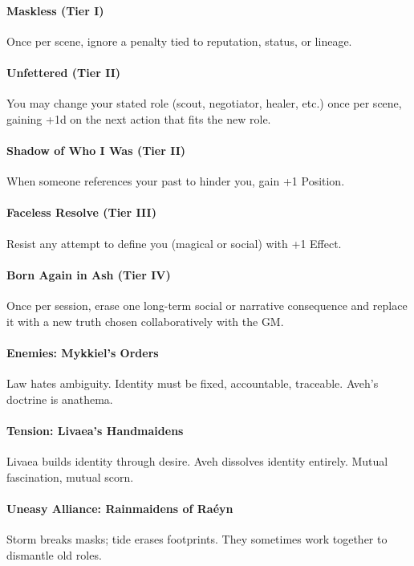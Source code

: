 \documentclass[11pt]{book}
\begin{document}
\paragraph{Maskless (Tier I)}
Once per scene, ignore a penalty tied to reputation, status, or lineage.

\paragraph{Unfettered (Tier II)}
You may change your stated role (scout, negotiator, healer, etc.) once per scene,  
gaining +1d on the next action that fits the new role.

\paragraph{Shadow of Who I Was (Tier II)}
When someone references your past to hinder you, gain +1 Position.

\paragraph{Faceless Resolve (Tier III)}
Resist any attempt to define you (magical or social) with +1 Effect.

\paragraph{Born Again in Ash (Tier IV)}
Once per session, erase one long-term social or narrative consequence  
and replace it with a new truth chosen collaboratively with the GM.

\paragraph{Enemies: Mykkiel's Orders}
Law hates ambiguity.  
Identity must be fixed, accountable, traceable.  
Aveh's doctrine is anathema.

\paragraph{Tension: Livaea's Handmaidens}
Livaea builds identity through desire.  
Aveh dissolves identity entirely.  
Mutual fascination, mutual scorn.

\paragraph{Uneasy Alliance: Rainmaidens of Raéyn}
Storm breaks masks; tide erases footprints.  
They sometimes work together to dismantle old roles.
\end{document}
